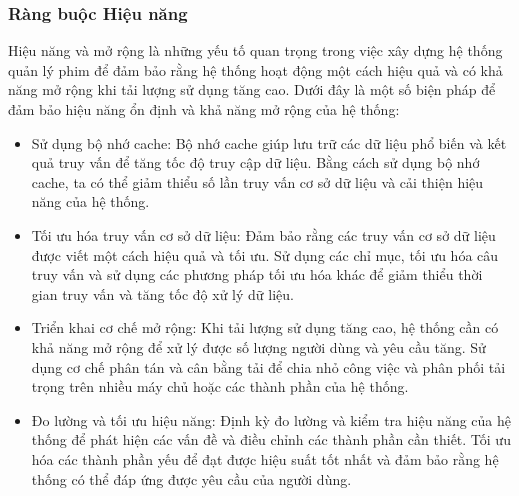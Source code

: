 \documentclass[12pt]{article}
\begin{document}
\subsubsection{Ràng buộc Hiệu năng}
Hiệu năng và mở rộng là những yếu tố quan trọng trong việc xây dựng hệ thống quản lý phim để đảm bảo rằng hệ thống hoạt động một cách hiệu quả và có khả năng mở rộng khi tải lượng sử dụng tăng cao. Dưới đây là một số biện pháp để đảm bảo hiệu năng ổn định và khả năng mở rộng của hệ thống:
\begin{itemize}
    \item Sử dụng bộ nhớ cache: Bộ nhớ cache giúp lưu trữ các dữ liệu phổ biến và kết quả truy vấn để tăng tốc độ truy cập dữ liệu. Bằng cách sử dụng bộ nhớ cache, ta có thể giảm thiểu số lần truy vấn cơ sở dữ liệu và cải thiện hiệu năng của hệ thống.

    \item Tối ưu hóa truy vấn cơ sở dữ liệu: Đảm bảo rằng các truy vấn cơ sở dữ liệu được viết một cách hiệu quả và tối ưu. Sử dụng các chỉ mục, tối ưu hóa câu truy vấn và sử dụng các phương pháp tối ưu hóa khác để giảm thiểu thời gian truy vấn và tăng tốc độ xử lý dữ liệu.

    \item Triển khai cơ chế mở rộng: Khi tải lượng sử dụng tăng cao, hệ thống cần có khả năng mở rộng để xử lý được số lượng người dùng và yêu cầu tăng. Sử dụng cơ chế phân tán và cân bằng tải để chia nhỏ công việc và phân phối tải trọng trên nhiều máy chủ hoặc các thành phần của hệ thống.

    \item Đo lường và tối ưu hiệu năng: Định kỳ đo lường và kiểm tra hiệu năng của hệ thống để phát hiện các vấn đề và điều chỉnh các thành phần cần thiết. Tối ưu hóa các thành phần yếu để đạt được hiệu suất tốt nhất và đảm bảo rằng hệ thống có thể đáp ứng được yêu cầu của người dùng.
\end{itemize}
\end{document}
